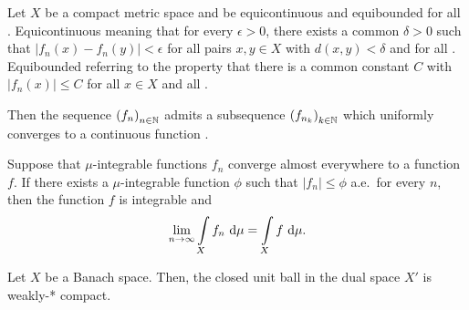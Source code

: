 \begin{theorem}\label{Arz-Asc}
	Let $X$ be a compact metric space and  be equicontinuous and equibounded for all \NinN. Equicontinuous meaning that for every $\epsilon > 0$, there exists a common $\delta > 0$ such that $|f_n(x) - f_n(y)| < \epsilon$ for all pairs $x, y \in X$ with $d(x, y) < \delta$ and for all \NinN. Equibounded referring to the property that there is a common constant $C$ with $|f_n(x)| \le C$ for all $x \in X$ and all \NinN.

	Then the sequence ${(f_n)}_{\NinN}$ admits a subsequence ${(f_{n_k})}_{\NinN[k]}$ which uniformly converges to a continuous function .
\end{theorem}

\begin{theorem}\label{Leb-DomCon}
	Suppose that $\mu$-integrable functions $f_n$ converge almost everywhere to a function $f$. If there exists a $\mu$-integrable function $\phi$ such that $|f_n| \le \phi$ a.e.~for every $n$, then the function $f$ is integrable and
	\[ \lim\limits_{\Ninf} \int\limits_X f_n~\D = \int\limits_X f~\D. \]
\end{theorem}

\begin{theorem}\label{Ban-Alao}
	Let $X$ be a Banach space. Then, the closed unit ball in the dual space $X'$ is weakly-* compact.
\end{theorem}